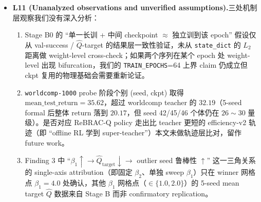 \begin{itemize}
    \item \textbf{L11 (Unanalyzed observations and unverified assumptions).}\quad 三处机制层观察我们没有深入分析：
    \begin{enumerate}
        \item Stage B0 的 ``单一长训 + 中间 checkpoint $\approx$ 独立训到该 epoch'' 假设仅从 val-success / $\hat{Q}$-target 的结果层一致性验证，未从 \texttt{state\_dict} 的 $L_2$ 距离做 weight-level cross-check；如果两个序列在某个 epoch 处 weight-level 出现 bifurcation，我们的 \texttt{TRAIN\_EPOCHS}=64 上界 claim 仍成立但 ckpt 复用的物理基础会需要重新论证。
        \item \texttt{worldcomp-1000} probe 阶段个别 (seed, ckpt) 取得 $\mathrm{mean\_test\_return} = 35.62$，超过 worldcomp teacher 的 $32.19$（5-seed formal 后整体 return 落到 $20.17$，但 seed 42/45/46 个体仍在 $26\sim30$ 量级）。是否对应 ReBRAC-Q policy 走出比 teacher 更短的 efficiency-v2 轨迹（即 ``offline RL 学到 super-teacher''）本文未做轨迹层比对，留作 future work。
        \item Finding 3 中 ``$\beta_1 \uparrow \to \hat{Q}_{\mathrm{target}} \downarrow \to$ outlier seed 鲁棒性 $\uparrow$'' 这一三角关系的 single-axis attribution（即固定 $\beta_2$、单独 sweep $\beta_1$）只在 winner 网格点 $\beta_1=4.0$ 处确认，其他 $\beta_1$ 网格点（$\in \{1.0, 2.0\}$）的 5-seed mean target $\hat{Q}$ 数据来自 Stage B 而非 confirmatory replication。
    \end{enumerate}


\end{itemize}
